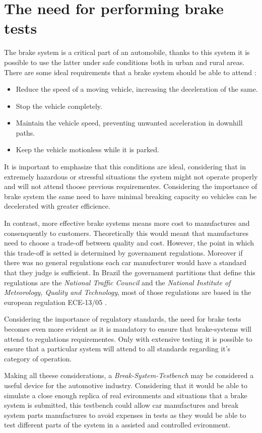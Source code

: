 \section{The need for performing brake tests}\label{sec:the-need-for-performing-brake-tests}
		The brake system is a critical part of an automobile, thanks to this system it is possible to use the latter under safe conditions both in urban and rural areas. There are some ideal requirements that a brake system should be able to attend \cite{kawaguchi} :

		\begin{itemize}
			\item Reduce the speed of a moving vehicle, increasing the deceleration of the same.
			\item Stop the vehicle completely.
			\item Maintain the vehicle speed, preventing unwanted acceleration in downhill paths.
			\item Keep the vehicle motionless while it is parked.
		\end{itemize}

		It is important to emphasize that this conditions are ideal, considering that in extremely hazardous or stressful situations the system might not operate properly and will not attend thoose previous requirementes. Considering the importance of brake system the same need to have minimal breaking capacity so vehicles can be decelerated with greater efficience. 
		\par
		In contrast, more effective brake systems means more cost to manufactures and consenquently to customers. Theoretically this would meant that manufactures need to choose a trade-off between quality and cost. However, the point in which this trade-off is setted is determined by governament regulations. Moreover if there was no general regulations each car manufecturer would have a standard that they judge is sufficient. In Brazil the governament partitions that define this regulations are the \textit{National Traffic Council} and the \textit{National Institute of Meteorology, Quality and Technology}, most of those regulations are based in the european regulation ECE-13/05 \cite{inmetro2013} .
		\par
		Considering the importance of regulatory standards, the need for brake tests becomes even more evident as it is mandatory to ensure that brake-systems will attend to regulations requirementes. Only with extensive testing it is possible to ensure that a particular system will attend to all standards regarding it's category of operation. 
		\par
		Making all theese considerations, a \textit{Break-System-Testbench} may be considered a useful device for the automotive industry. Considering that it would be able to simulate a close enough replica of real evironments and situations that a brake system is submitted, this testbench could allow car manufactures and break system parts manufactures to avoid expenses in tests as they would be able to test different parts of the system in a assisted and controlled evironment.
